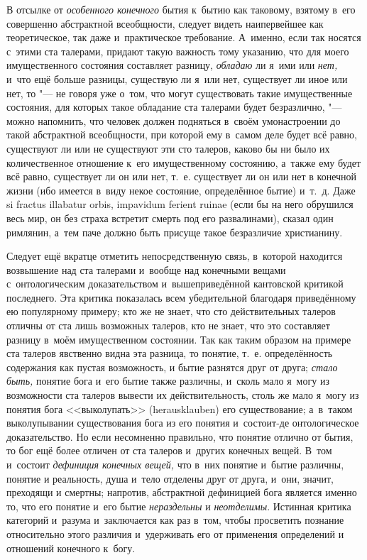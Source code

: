 В отсылке от {\em особенного конечного} бытия к~бытию как таковому, взятому
в~его совершенно абстрактной всеобщности, следует видеть наипервейшее как
теоретическое, так даже и~практическое требование. А~именно, если так носятся
с~этими ста талерами, придают такую важность тому указанию, что для моего
имущественного состояния составляет разницу, {\em обладаю} ли я~ими или
{\em нет,} и~что ещё больше разницы, существую ли я~или нет, существует ли иное
или нет, то "--- не говоря уже о~том, что могут существовать такие
имущественные состояния, для которых такое обладание ста талерами будет
безразлично, "--- можно напомнить, что человек должен подняться в~своём
умонастроении до такой абстрактной всеобщности, при которой ему в~самом деле
будет всё равно, существуют ли или не существуют эти сто талеров, каково бы ни
было их количественное отношение к~его имущественному состоянию, а~также ему
будет всё равно, существует ли он или нет, т.~е. существует ли он или нет в
конечной жизни (ибо имеется в~виду некое состояние, определённое бытие) и~т.~д.
Даже si fractus illabatur orbis, impavidum ferient ruinae (если бы на него
обрушился весь мир, он без страха встретит смерть под его развалинами), сказал
один римлянин, а~тем паче должно быть присуще такое безразличие христианину.

Следует ещё вкратце отметить непосредственную связь, в~которой находится
возвышение над ста талерами и~вообще над конечными вещами с~онтологическим
доказательством и~вышеприведённой кантовской критикой последнего. Эта критика
показалась всем убедительной благодаря приведённому ею популярному примеру; кто
же не знает, что сто действительных талеров отличны от ста лишь возможных
талеров, кто не знает, что это составляет разницу в~моём имущественном
состоянии. Так как таким образом на примере ста талеров явственно видна эта
разница, то понятие, т.~е. определённость содержания как пустая возможность, и
бытие разнятся друг от друга; {\em стало быть,} понятие бога и~его бытие также
различны, и~сколь мало я~могу из возможности ста талеров вывести их
действительность, столь же мало я~могу из понятия бога <<выколупать>>
(heraus\-klau\-ben) его существование; а~в~таком выколупывании существования
бога из его понятия и~состоит-де онтологическое доказательство. Но если
несомненно правильно, что понятие отлично от бытия, то бог ещё более
отличен от ста талеров и~других конечных вещей. В~том и~состоит
{\em дефиниция конечных вещей,} что в~них понятие и~бытие различны, понятие
и реальность, душа и~тело отделены друг от друга, и~они, значит, преходящи
и смертны; напротив, абстрактной дефиницией бога является именно то, что его
понятие и~его бытие {\em нераздельны} и {\em неотделимы}. Истинная критика
категорий и~разума и~заключается как раз в~том, чтобы просветить познание
относительно этого различия и~удерживать его от применения определений и
отношений конечного к~богу.\label{bkm:bm85b}

